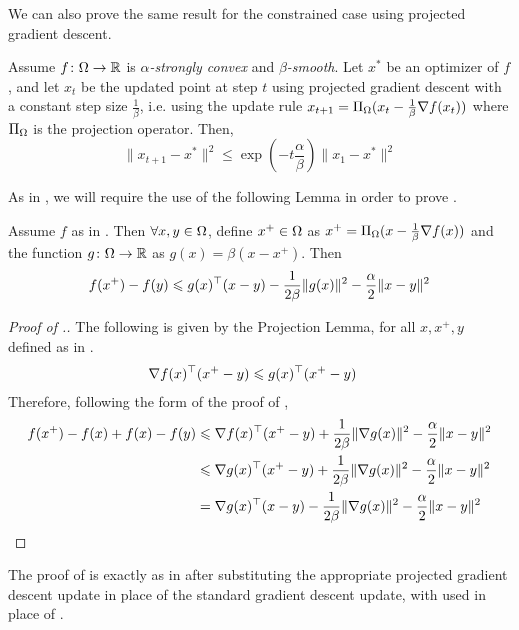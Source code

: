 We can also prove the same result for the constrained case using projected
gradient descent.

\begin{theorem} 
Assume $f\colon\Omega\to\mathbb{R}$ is \emph{$\alpha$-strongly convex} and
\emph{$\beta$-smooth}. Let $x^{*}$ be an optimizer of $f$, and let $x_{t}$ be
the updated point at step $t$ using projected gradient descent with a constant
step size $\frac{1}{\beta}$, i.e. using the update rule $x_{t+1} =
\Pi_{\Omega}(x_{t} - \frac{1}{\beta}\nabla f(x_{t}))$ where $\Pi_{\Omega}$ is
the projection operator. Then, 
\[
\|x_{t+1} - x^*\|^2 \leq \exp{(-t \frac{\alpha}{\beta})}\|x_1 - x^*\|^2
\]
\end{theorem}
As in , we will require the
use of the following Lemma in order to prove
. 

\begin{lemma}
    Assume $f$ as in . Then $\forall x,y \in \Omega$, define $x^+\in\Omega$ as $x^+ = \Pi_{\Omega}(x - \frac{1}{\beta}\nabla f(x))$ and the function $g\colon\Omega\to\mathbb{R}$ as $g(x) = \beta(x-x^+)$. Then
    \[
        f(x^+) - f(y) \leqslant g(x)^\top (x-y) - \frac{1}{2\beta}\|g(x)\|^2 - \frac{\alpha}{2}\|x-y\|^2
    \]
\end{lemma}

\begin{proof}[Proof of .]
    The following is given by the Projection Lemma, for all $x,x^+,y$ defined as in .
    \begin{align*}
        \nabla f(x)^\top (x^+ - y) &\leqslant g(x)^\top(x^+ - y)
    \end{align*}
    Therefore, following the form of the proof of ,
    \begin{align*}
        f(x^+) - f(x) + f(x) - f(y) &\leqslant \nabla f(x)^\top(x^+-y) + \frac{1}{2\beta}\|\nabla g(x)\|^2 - \frac{\alpha}{2}\|x-y\|^2\\
        &\leqslant \nabla g(x)^\top(x^+-y) + \frac{1}{2\beta}\|\nabla g(x)\|^2 - \frac{\alpha}{2}\|x-y\|^2\\
        &= \nabla g(x)^\top(x-y) - \frac{1}{2\beta}\|\nabla g(x)\|^2 - \frac{\alpha}{2}\|x-y\|^2\\
    \end{align*}
\end{proof}

The proof of  is
exactly as in  after
substituting the appropriate projected gradient descent update in place of the
standard gradient descent update, with
 used in place of
. 

